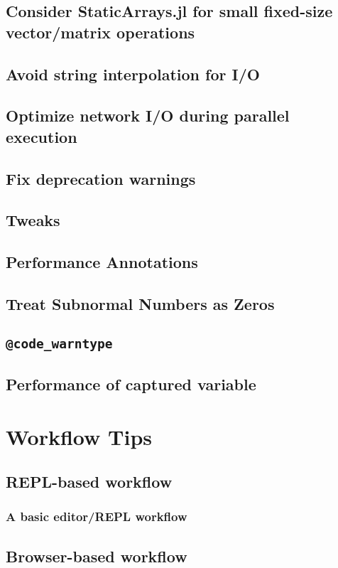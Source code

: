     \section{Consider StaticArrays.jl for small fixed-size vector/matrix operations}
    \section{Avoid string interpolation for I/O}
    \section{Optimize network I/O during parallel execution}
    \section{Fix deprecation warnings}
    \section{Tweaks}
    \section{Performance Annotations}
    \section{Treat Subnormal Numbers as Zeros}
    \section{\texttt{@code\_warntype}}
    \section{Performance of captured variable}
  \chapter{Workflow Tips}
    \section{REPL-based workflow}
    \subsection{A basic editor/REPL workflow}
    \section{Browser-based workflow}
